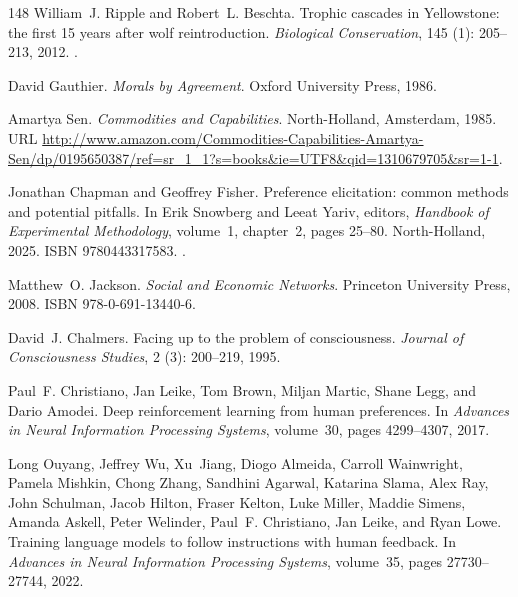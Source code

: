 \documentclass[11pt]{article}
\theoremstyle{plain}
\theoremstyle{definition}
\theoremstyle{remark}
\begin{document}
\begin{thebibliography}{148}
William~J. Ripple and Robert~L. Beschta.
\newblock Trophic cascades in {Yellowstone}: the first 15 years after wolf
  reintroduction.
\newblock \emph{Biological Conservation}, 145 (1): 205--213,
  2012.
\newblock {}.

David Gauthier.
\newblock \emph{Morals by Agreement}.
\newblock Oxford University Press, 1986.

Amartya Sen.
\newblock \emph{Commodities and Capabilities}.
\newblock North-Holland, Amsterdam, 1985.
\newblock URL
  \url{http://www.amazon.com/Commodities-Capabilities-Amartya-Sen/dp/0195650387/ref=sr_1_1?s=books\&ie=UTF8\&qid=1310679705\&sr=1-1}.

Jonathan Chapman and Geoffrey Fisher.
\newblock Preference elicitation: common methods and potential pitfalls.
\newblock In Erik Snowberg and Leeat Yariv, editors, \emph{Handbook of
  Experimental Methodology}, volume~1, chapter~2, pages 25--80. North-Holland,
  2025.
\newblock ISBN 9780443317583.
\newblock {}.

Matthew~O. Jackson.
\newblock \emph{Social and Economic Networks}.
\newblock Princeton University Press, 2008.
\newblock ISBN 978-0-691-13440-6.

David~J. Chalmers.
\newblock Facing up to the problem of consciousness.
\newblock \emph{Journal of Consciousness Studies}, 2 (3):
  200--219, 1995.

Paul~F. Christiano, Jan Leike, Tom Brown, Miljan Martic, Shane Legg, and Dario
  Amodei.
\newblock Deep reinforcement learning from human preferences.
\newblock In \emph{Advances in Neural Information Processing Systems},
  volume~30, pages 4299--4307, 2017.

Long Ouyang, Jeffrey Wu, Xu~Jiang, Diogo Almeida, Carroll Wainwright, Pamela
  Mishkin, Chong Zhang, Sandhini Agarwal, Katarina Slama, Alex Ray, John
  Schulman, Jacob Hilton, Fraser Kelton, Luke Miller, Maddie Simens, Amanda
  Askell, Peter Welinder, Paul~F. Christiano, Jan Leike, and Ryan Lowe.
\newblock Training language models to follow instructions with human feedback.
\newblock In \emph{Advances in Neural Information Processing Systems},
  volume~35, pages 27730--27744, 2022.


\end{thebibliography}
\end{document}
